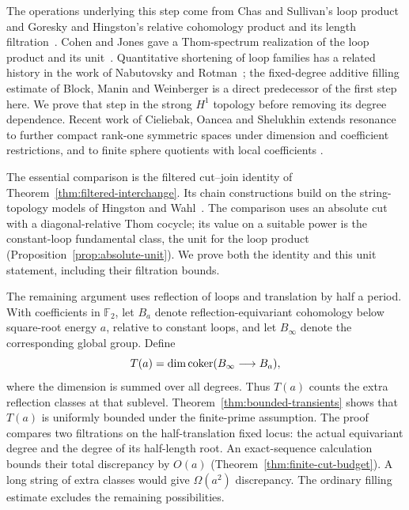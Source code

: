 The operations underlying this step come from Chas and Sullivan's loop
product~\cite{ChasSullivan1999} and Goresky and Hingston's relative
cohomology product and its length filtration~\cite{GoreskyHingston2009}.
Cohen and Jones gave a Thom-spectrum realization of the loop product
and its unit~\cite{CohenJones2002}.
Quantitative shortening of loop families has a related history in the
work of Nabutovsky and Rotman~\cite{NabutovskyRotman2013}; the
fixed-degree additive filling estimate of Block, Manin and Weinberger
\cite[Theorem 5.1]{BlockManinWeinberger2025} is a direct predecessor of
the first step here. We prove that step in the strong $H^1$ topology
before removing its degree dependence. Recent work of Cieliebak, Oancea
and Shelukhin extends resonance to further compact rank-one symmetric
spaces under dimension and coefficient restrictions, and to finite sphere
quotients with local coefficients
\cite[Theorem~6.1 and Corollary~8.4]{CieliebakOanceaShelukhin2026}.

The essential comparison is the filtered cut--join identity of
Theorem~\ref{thm:filtered-interchange}. Its chain constructions build on
the string-topology models of Hingston and Wahl~\cite{HingstonWahl2023}.
The comparison uses an absolute cut with a diagonal-relative Thom cocycle;
its value on a suitable power is the constant-loop fundamental class,
the unit for the loop product (Proposition~\ref{prop:absolute-unit}).
We prove both the identity and this unit statement, including their
filtration bounds.

The remaining argument uses reflection of loops and translation by half a
period. With coefficients in $\mathbb F_2$, let $B_a$ denote
reflection-equivariant cohomology below
square-root energy $a$, relative to constant loops, and let $B_\infty$
denote the corresponding global group. Define
\[
 T(a)=\dim\operatorname{coker}(B_\infty\longrightarrow B_a),
\]
where the dimension is summed over all degrees. Thus $T(a)$ counts the
extra reflection classes at that sublevel. Theorem~\ref{thm:bounded-transients}
shows that $T(a)$ is uniformly bounded under the finite-prime assumption.
The proof compares two filtrations on the half-translation fixed locus:
the actual equivariant degree and the degree of its half-length root.
An exact-sequence calculation bounds their total discrepancy by $O(a)$
(Theorem~\ref{thm:finite-cut-budget}). A long string of extra classes would
give $\Omega(a^2)$ discrepancy. The ordinary filling estimate excludes the
remaining possibilities.

